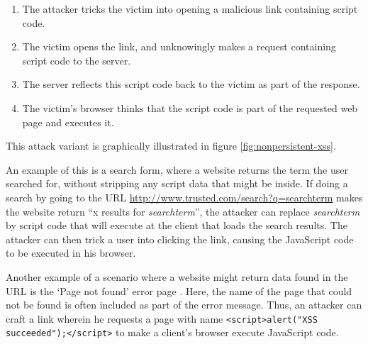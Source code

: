 \begin{enumerate}
	\item The attacker tricks the victim into opening a malicious link containing script code.
	\item The victim opens the link, and unknowingly makes a request containing script code to the server.
	\item The server reflects this script code back to the victim as part of the response.
	\item The victim's browser thinks that the script code is part of the requested web page and executes it.
\end{enumerate}

This attack variant is graphically illustrated in figure \ref{fig:nonpersistent-xss}.

An example of this is a search form, where a website returns the term the user searched for, without stripping any script data that might be inside. If doing a search by going to the URL \url{http://www.trusted.com/search?q=searchterm} makes the website return ``x results for \emph{searchterm}'', the attacker can replace \emph{searchterm} by script code that will execute at the client that loads the search results. The attacker can then trick a user into clicking the link, causing the JavaScript code to be executed in his browser.

Another example of a scenario where a website might return data found in the URL is the `Page not found' error page \cite{Kirda2006}. Here, the name of the page that could not be found is often included as part of the error message. Thus, an attacker can craft a link wherein he requests a page with name \texttt{<script>alert("XSS succeeded");</script>} to make a client's browser execute JavaScript code.

